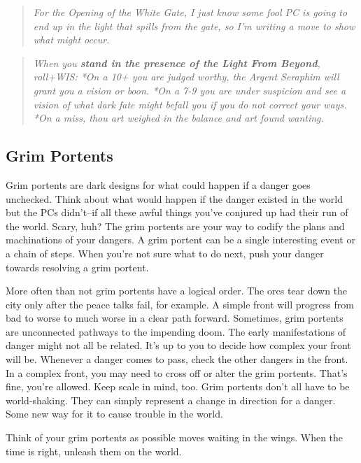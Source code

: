 \begin{quote}
\emph{For the Opening of the White Gate, I just know some fool PC is going to end up in the light that spills from the gate, so I'm writing a move to show what might occur.}
\end{quote}


\begin{quote}
\emph{When you \textbf{stand in the presence of the Light From Beyond}, roll+WIS: *On a 10+ you are judged worthy, the Argent Seraphim will grant you a vision or boon. *On a 7-9 you are under suspicion and see a vision of what dark fate might befall you if you do not correct your ways. *On a miss, thou art weighed in the balance and art found wanting.}
\end{quote}
\subsection{Grim Portents}


Grim portents are dark designs for what could happen if a danger goes unchecked. Think about what would happen if the danger existed in the world but the PCs didn't--if all these awful things you've conjured up had their run of the world. Scary, huh? The grim portents are your way to codify the plans and machinations of your dangers. A grim portent can be a single interesting event or a chain of steps. When you're not sure what to do next, push your danger towards resolving a grim portent.


More often than not grim portents have a logical order. The orcs tear down the city only after the peace talks fail, for example. A simple front will progress from bad to worse to much worse in a clear path forward. Sometimes, grim portents are unconnected pathways to the impending doom. The early manifestations of danger might not all be related. It's up to you to decide how complex your front will be. Whenever a danger comes to pass, check the other dangers in the front. In a complex front, you may need to cross off or alter the grim portents. That's fine, you're allowed. Keep scale in mind, too. Grim portents don't all have to be world-shaking. They can simply represent a change in direction for a danger. Some new way for it to cause trouble in the world.


Think of your grim portents as possible moves waiting in the wings. When the time is right, unleash them on the world.


